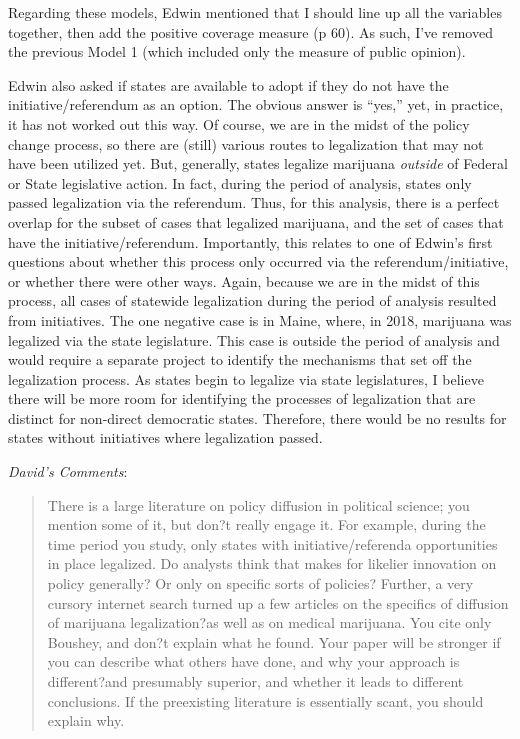 \documentclass[12pt,stdletter,dateno,sigleft]{newlfm} %
\begin{document}
\begin{newlfm}
Regarding these models, Edwin mentioned that I should line up all the variables together, then add the positive coverage measure (p 60). As such, I've removed the previous Model 1 (which included only the measure of public opinion).

Edwin also asked if states are available to adopt if they do not have the initiative/referendum as an option. The obvious answer is ``yes,'' yet, in practice, it has not worked out this way. Of course, we are in the midst of the policy change process, so there are (still) various routes to legalization that may not have been utilized yet. But, generally, states legalize marijuana \textit{outside} of Federal or State legislative action. In fact, during the period of analysis, states only passed legalization via the referendum. Thus, for this analysis, there is a perfect overlap for the subset of cases that legalized marijuana, and the set of cases that have the initiative/referendum. Importantly, this relates to one of Edwin's first questions about whether this process only occurred via the referendum/initiative, or whether there were other ways. Again, because we are in the midst of this process, all cases of statewide legalization during the period of analysis resulted from initiatives. The one negative case is in Maine, where, in 2018, marijuana was legalized via the state legislature. This case is outside the period of analysis and would require a separate project to identify the mechanisms that set off the legalization process. As states begin to legalize via state legislatures, I believe there will be more room for identifying the processes of legalization that are distinct for non-direct democratic states. Therefore, there would be no results for states without initiatives where legalization passed.\newline


\textit{David's Comments}:

\begin{quotation}{\color{red}\noindent \footnotesize
There is a large literature on policy diffusion in political science; you mention some of it, but don?t really engage it. For example, during the time period you study, only states with initiative/referenda opportunities in place legalized. Do analysts think that makes for likelier innovation on policy generally? Or only on specific sorts of policies? Further, a very cursory internet search turned up a few articles on the specifics of diffusion of marijuana legalization?as well as on medical marijuana. You cite only Boushey, and don?t explain what he found. Your paper will be stronger if you can describe what others have done, and why your approach is different?and presumably superior, and whether it leads to different conclusions. If the preexisting literature is essentially scant, you should explain why.
}
\end{quotation}


\end{newlfm}
\end{document}
